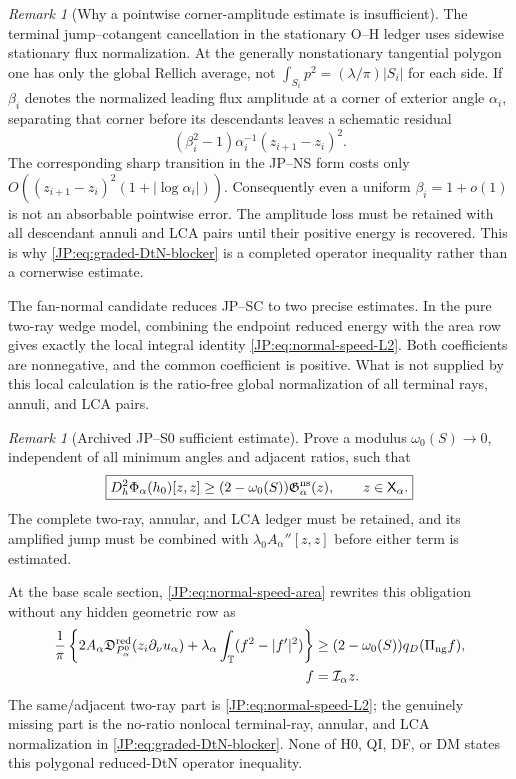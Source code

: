 \documentclass[11pt]{amsart}
\numberwithin{equation}{section}
\theoremstyle{definition}
\theoremstyle{remark}
\newtheorem{remark}[theorem]{Remark}
\newcommand{\Dred}{\mathfrak D^{\rm red}}
\begin{document}
\begin{remark}[Why a pointwise corner-amplitude estimate is insufficient]
The terminal jump--cotangent cancellation in the stationary O--H ledger
uses sidewise stationary flux normalization.  At the generally
nonstationary tangential polygon one has only the global Rellich average,
not
\(
 \int_{S_i}p^2=(\lambda/\pi)|S_i|
\)
for each side.  If $\beta_i$ denotes the normalized leading flux amplitude
at a corner of exterior angle $\alpha_i$, separating that corner before
its descendants leaves a schematic residual
\[
 (\beta_i^2-1)\alpha_i^{-1}(z_{i+1}-z_i)^2.
\]
The corresponding sharp transition in the JP--NS form costs only
$O((z_{i+1}-z_i)^2(1+|\log\alpha_i|))$.  Consequently even a uniform
$\beta_i=1+o(1)$ is not an absorbable pointwise error.  The amplitude loss
must be retained with all descendant annuli and LCA pairs until their
positive energy is recovered.  This is why \eqref{JP:eq:graded-DtN-blocker}
is a completed operator inequality rather than a cornerwise estimate.
\end{remark}

The fan-normal candidate reduces JP--SC to two precise estimates.  In the
pure two-ray wedge model, combining the endpoint reduced energy with the
area row gives exactly the local integral identity
\eqref{JP:eq:normal-speed-L2}.
Both coefficients are nonnegative, and the common coefficient is positive.
What is not supplied by this local calculation is the ratio-free global
normalization of all terminal rays, annuli, and LCA pairs.

\begin{remark}[Archived JP--S0 sufficient estimate]
\label{JP:rem:S0}
Prove a modulus $\omega_0(S)\to0$, independent of all minimum angles and
adjacent ratios, such that
\begin{equation}\label{JP:eq:S0}
 \boxed{
 D_h^2\Phi_\alpha(h_0)[z,z]
 \ge(2-\omega_0(S))\mathfrak G_\alpha^{\rm ns}(z),
 \qquad z\in\mathsf X_\alpha.}
\end{equation}
The complete two-ray, annular, and LCA ledger must be retained, and its
amplified jump must be combined with $\lambda_0A_\alpha''[z,z]$ before
either term is estimated.
\end{remark}

At the base scale section, \eqref{JP:eq:normal-speed-area} rewrites this
obligation without any hidden geometric row as
\begin{equation}\label{JP:eq:graded-DtN-blocker}
 \begin{aligned}
 \frac1\pi\left\{
 2A_\alpha\Dred_{P_\alpha^0}(z_i\partial_\nu u_\alpha)
 +\lambda_\alpha\int_{\mathbb T}(f^2-|f'|^2)\right\}
 &\ge(2-\omega_0(S))q_D(\Pi_{\rm ng}f),\\
 f&=\mathcal I_\alpha z.
 \end{aligned}
\end{equation}
The same/adjacent two-ray part is \eqref{JP:eq:normal-speed-L2}; the genuinely
missing part is the no-ratio nonlocal terminal-ray, annular, and LCA
normalization in \eqref{JP:eq:graded-DtN-blocker}.  None of H0, QI, DF, or DM
states this polygonal reduced-DtN operator inequality.
\end{document}
